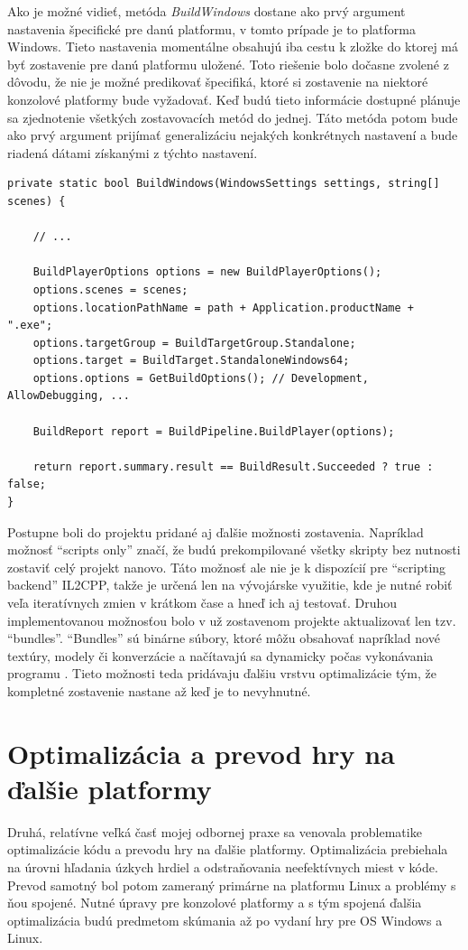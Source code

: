 \documentclass[slovak, bachelorpractice]{diploma}
\begin{document}
Ako je možné vidieť, metóda \textit{BuildWindows} dostane ako prvý argument nastavenia špecifické pre danú platformu, v tomto prípade je to platforma Windows. Tieto nastavenia momentálne obsahujú iba cestu k zložke do ktorej má byť zostavenie pre danú platformu uložené. Toto riešenie bolo dočasne zvolené z dôvodu, že nie je možné predikovať špecifiká, ktoré si zostavenie na niektoré konzolové platformy bude vyžadovať. Keď budú tieto informácie dostupné plánuje sa zjednotenie všetkých zostavovacích metód do jednej. Táto metóda potom bude ako prvý argument prijímať generalizáciu nejakých konkrétnych nastavení a bude riadená dátami získanými z týchto nastavení.

\vspace{10pt}
\begin{lstlisting}[label=src:bwin,caption={Nastavenie a spustenie programového zostavenia hry pre OS Windows}]
private static bool BuildWindows(WindowsSettings settings, string[] scenes) {

	// ...
	
    BuildPlayerOptions options = new BuildPlayerOptions();
    options.scenes = scenes;
    options.locationPathName = path + Application.productName + ".exe";
    options.targetGroup = BuildTargetGroup.Standalone;
    options.target = BuildTarget.StandaloneWindows64;
    options.options = GetBuildOptions(); // Development, AllowDebugging, ...

    BuildReport report = BuildPipeline.BuildPlayer(options);
    
    return report.summary.result == BuildResult.Succeeded ? true : false;
}
\end{lstlisting}

Postupne boli do projektu pridané aj ďalšie možnosti zostavenia. Napríklad možnosť \enquote{scripts only} značí, že budú prekompilované všetky skripty bez nutnosti zostaviť celý projekt nanovo. Táto možnosť ale nie je k dispozícií pre \enquote{scripting backend} IL2CPP, takže je určená len na vývojárske využitie, kde je nutné robiť veľa iteratívnych zmien v krátkom čase a hneď ich aj testovať. Druhou implementovanou možnosťou bolo v už zostavenom projekte aktualizovať len tzv. \enquote{bundles}. \enquote{Bundles} sú binárne súbory, ktoré môžu obsahovať napríklad nové textúry, modely či konverzácie a načítavajú sa dynamicky počas vykonávania programu \cite{Bundles}. Tieto možnosti teda pridávaju ďalšiu vrstvu optimalizácie tým, že kompletné zostavenie nastane až keď je to nevyhnutné.

\section{Optimalizácia a prevod hry na ďalšie platformy}
\label{sec:Port}
Druhá, relatívne veľká časť mojej odbornej praxe sa venovala problematike optimalizácie kódu a prevodu hry na ďalšie platformy. Optimalizácia prebiehala na úrovni hľadania úzkych hrdiel a odstraňovania neefektívnych miest v kóde. Prevod samotný bol potom zameraný primárne na platformu Linux a problémy s ňou spojené. Nutné úpravy pre konzolové platformy a s tým spojená ďalšia optimalizácia budú predmetom skúmania až po vydaní hry pre OS Windows a Linux. 
\end{document}
